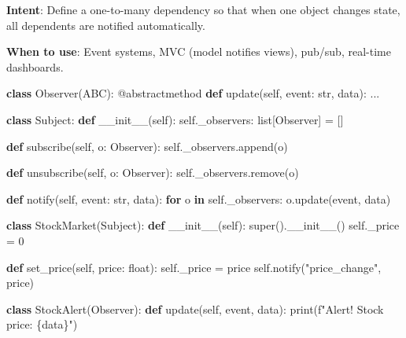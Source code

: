 \documentclass[11pt]{article}
\newenvironment{Shaded}{\begin{snugshade}}{\end{snugshade}}
\newcommand{\AttributeTok}[1]{\textcolor[rgb]{0.16,0.50,0.73}{#1}}
\newcommand{\BuiltInTok}[1]{\textcolor[rgb]{0.50,0.55,0.55}{#1}}
\newcommand{\ControlFlowTok}[1]{\textcolor[rgb]{0.99,0.74,0.29}{\textbf{#1}}}
\newcommand{\DecValTok}[1]{\textcolor[rgb]{0.96,0.45,0.00}{#1}}
\newcommand{\FunctionTok}[1]{\textcolor[rgb]{0.56,0.27,0.68}{#1}}
\newcommand{\KeywordTok}[1]{\textcolor[rgb]{0.81,0.81,0.76}{\textbf{#1}}}
\newcommand{\NormalTok}[1]{\textcolor[rgb]{0.81,0.81,0.76}{#1}}
\newcommand{\OperatorTok}[1]{\textcolor[rgb]{0.81,0.81,0.76}{#1}}
\newcommand{\SpecialCharTok}[1]{\textcolor[rgb]{0.24,0.68,0.91}{#1}}
\newcommand{\SpecialStringTok}[1]{\textcolor[rgb]{0.85,0.27,0.33}{#1}}
\newcommand{\StringTok}[1]{\textcolor[rgb]{0.96,0.31,0.31}{#1}}
\newcommand{\VariableTok}[1]{\textcolor[rgb]{0.15,0.68,0.68}{#1}}
\begin{document}
\textbf{Intent}: Define a one-to-many dependency so that when one object changes state, all dependents are notified automatically.

\textbf{When to use}: Event systems, MVC (model notifies views), pub/sub, real-time dashboards.


\begin{Shaded}
\begin{Highlighting}[]
\KeywordTok{class}\NormalTok{ Observer(ABC):}
    \AttributeTok{@abstractmethod}
    \KeywordTok{def}\NormalTok{ update(}\VariableTok{self}\NormalTok{, event: }\BuiltInTok{str}\NormalTok{, data): ...}

\KeywordTok{class}\NormalTok{ Subject:}
    \KeywordTok{def} \FunctionTok{\_\_init\_\_}\NormalTok{(}\VariableTok{self}\NormalTok{):}
        \VariableTok{self}\NormalTok{.\_observers: }\BuiltInTok{list}\NormalTok{[Observer] }\OperatorTok{=}\NormalTok{ []}

    \KeywordTok{def}\NormalTok{ subscribe(}\VariableTok{self}\NormalTok{, o: Observer):}
        \VariableTok{self}\NormalTok{.\_observers.append(o)}

    \KeywordTok{def}\NormalTok{ unsubscribe(}\VariableTok{self}\NormalTok{, o: Observer):}
        \VariableTok{self}\NormalTok{.\_observers.remove(o)}

    \KeywordTok{def}\NormalTok{ notify(}\VariableTok{self}\NormalTok{, event: }\BuiltInTok{str}\NormalTok{, data):}
        \ControlFlowTok{for}\NormalTok{ o }\KeywordTok{in} \VariableTok{self}\NormalTok{.\_observers:}
\NormalTok{            o.update(event, data)}

\KeywordTok{class}\NormalTok{ StockMarket(Subject):}
    \KeywordTok{def} \FunctionTok{\_\_init\_\_}\NormalTok{(}\VariableTok{self}\NormalTok{):}
        \BuiltInTok{super}\NormalTok{().}\FunctionTok{\_\_init\_\_}\NormalTok{()}
        \VariableTok{self}\NormalTok{.\_price }\OperatorTok{=} \DecValTok{0}

    \KeywordTok{def}\NormalTok{ set\_price(}\VariableTok{self}\NormalTok{, price: }\BuiltInTok{float}\NormalTok{):}
        \VariableTok{self}\NormalTok{.\_price }\OperatorTok{=}\NormalTok{ price}
        \VariableTok{self}\NormalTok{.notify(}\StringTok{"price\_change"}\NormalTok{, price)}

\KeywordTok{class}\NormalTok{ StockAlert(Observer):}
    \KeywordTok{def}\NormalTok{ update(}\VariableTok{self}\NormalTok{, event, data):}
        \BuiltInTok{print}\NormalTok{(}\SpecialStringTok{f"Alert! Stock price: }\SpecialCharTok{\{}\NormalTok{data}\SpecialCharTok{\}}\SpecialStringTok{"}\NormalTok{)}


\end{Highlighting}
\end{Shaded}
\end{document}
